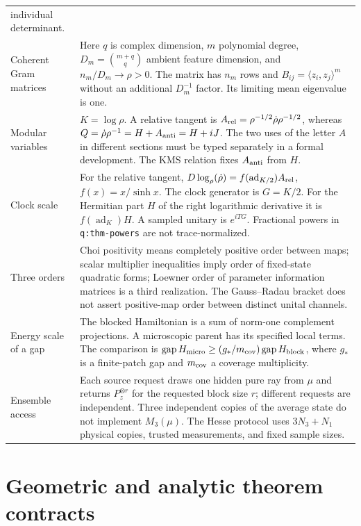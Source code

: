 \begin{longtable}{@{}p{.23\linewidth}p{.72\linewidth}@{}}
individual determinant.\\
Coherent Gram matrices & Here $q$ is complex dimension, $m$ polynomial
degree, $D_m=\binom{m+q}{q}$ ambient feature dimension, and
$n_m/D_m\to\rho>0$. The matrix has $n_m$ rows and
$B_{ij}=\langle z_i,z_j\rangle^m$ without an additional $D_m^{-1}$
factor. Its limiting mean eigenvalue is one.\\
Modular variables & $K=\log\rho$. A relative tangent is
$A_{\rm rel}=\rho^{-1/2}\dot\rho\rho^{-1/2}$, whereas
$Q=\dot\rho\rho^{-1}=H+A_{\rm anti}=H+iJ$. The two uses of the
letter $A$ in different sections must be typed separately in a formal
development. The KMS relation fixes $A_{\rm anti}$ from $H$.\\
Clock scale & For the relative tangent,
$D\log_\rho(\dot\rho)=f(\operatorname{ad}_{K/2})A_{\rm rel}$,
$f(x)=x/\sinh x$. The clock generator is $G=K/2$.
For the Hermitian part $H$ of the right logarithmic derivative it is
$f(\operatorname{ad}_K)H$. A sampled unitary is $e^{iTG}$.
Fractional powers in \texttt{q:thm-powers} are not trace-normalized.\\
Three orders & Choi positivity means completely positive order between
maps; scalar multiplier inequalities imply order of fixed-state
quadratic forms; Loewner order of parameter information matrices is a
third realization. The Gauss--Radau bracket does not assert positive-map
order between distinct unital channels.\\
Energy scale of a gap & The blocked Hamiltonian is a sum of norm-one
complement projections. A microscopic parent has its specified local
terms. The comparison is
$\operatorname{gap}H_{\rm micro}\ge(g_*/m_{\rm cov})
\operatorname{gap}H_{\rm block}$, where $g_*$ is a finite-patch gap
and $m_{\rm cov}$ a coverage multiplicity.\\
Ensemble access & Each source request draws one hidden pure ray from
$\mu$ and returns $P_z^{\otimes r}$ for the requested block size $r$;
different requests are independent. Three independent copies of the
average state do not implement $M_3(\mu)$. The Hesse protocol uses
$3N_3+N_1$ physical copies, trusted measurements, and fixed sample sizes.\\
\bottomrule
\end{longtable}

\section{Geometric and analytic theorem contracts}


